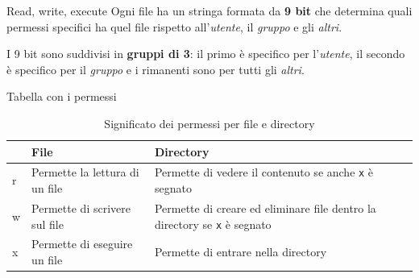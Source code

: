 \documentclass{beamer}
\begin{document}
\begin{frame}{Read, write, execute}
  Ogni file ha un stringa formata da \textbf{9 bit} che determina quali 
  permessi specifici ha quel file rispetto all'\textit{utente}, il 
  \textit{gruppo} e gli \textit{altri}.\bigskip

  I 9 bit sono suddivisi in \textbf{gruppi di 3}: il primo è specifico per 
  l'\textit{utente}, il secondo è specifico per il \textit{gruppo} e i rimanenti
  sono per tutti gli \textit{altri}.
  \begin{figure}
  \end{figure}
\end{frame}

\begin{frame}{Tabella con i permessi}
  \begin{table}
    \begin{tabularx}{\textwidth}{|l|l|X|}
      \hline
      & File  & Directory  \\ \hline
      r & Permette la lettura di un file & Permette di vedere il contenuto se 
      anche \texttt{x} è segnato\\ \hline
      w & Permette di scrivere sul file  & Permette di creare ed eliminare file 
      dentro la directory se \texttt{x} è segnato \\ \hline
      x & Permette di eseguire un file   & Permette di entrare nella 
      directory \\ \hline
    \end{tabularx}
    \caption{Significato dei permessi per file e directory}
  \end{table}
\end{frame}
\end{document}
